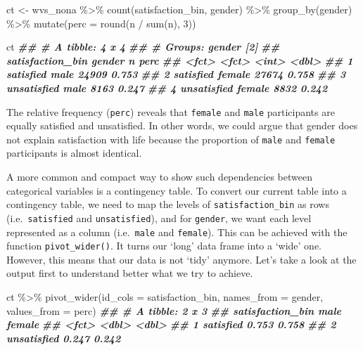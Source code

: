 \documentclass[
]{book}
\newenvironment{Shaded}{\begin{snugshade}}{\end{snugshade}}
\newcommand{\AttributeTok}[1]{\textcolor[rgb]{0.77,0.63,0.00}{#1}}
\newcommand{\DecValTok}[1]{\textcolor[rgb]{0.00,0.00,0.81}{#1}}
\newcommand{\DocumentationTok}[1]{\textcolor[rgb]{0.56,0.35,0.01}{\textbf{\textit{#1}}}}
\newcommand{\FunctionTok}[1]{\textcolor[rgb]{0.00,0.00,0.00}{#1}}
\newcommand{\NormalTok}[1]{#1}
\newcommand{\OtherTok}[1]{\textcolor[rgb]{0.56,0.35,0.01}{#1}}
\newcommand{\SpecialCharTok}[1]{\textcolor[rgb]{0.00,0.00,0.00}{#1}}
\begin{document}
\begin{Shaded}
\begin{Highlighting}[]
\NormalTok{ct }\OtherTok{\textless{}{-}}\NormalTok{ wvs\_nona }\SpecialCharTok{\%\textgreater{}\%}
  \FunctionTok{count}\NormalTok{(satisfaction\_bin, gender) }\SpecialCharTok{\%\textgreater{}\%}
  \FunctionTok{group\_by}\NormalTok{(gender) }\SpecialCharTok{\%\textgreater{}\%}
  \FunctionTok{mutate}\NormalTok{(}\AttributeTok{perc =} \FunctionTok{round}\NormalTok{(n }\SpecialCharTok{/} \FunctionTok{sum}\NormalTok{(n), }\DecValTok{3}\NormalTok{))}

\NormalTok{ct}
\DocumentationTok{\#\# \# A tibble: 4 x 4}
\DocumentationTok{\#\# \# Groups:   gender [2]}
\DocumentationTok{\#\#   satisfaction\_bin gender     n  perc}
\DocumentationTok{\#\#   \textless{}fct\textgreater{}            \textless{}fct\textgreater{}  \textless{}int\textgreater{} \textless{}dbl\textgreater{}}
\DocumentationTok{\#\# 1 satisfied        male   24909 0.753}
\DocumentationTok{\#\# 2 satisfied        female 27674 0.758}
\DocumentationTok{\#\# 3 unsatisfied      male    8163 0.247}
\DocumentationTok{\#\# 4 unsatisfied      female  8832 0.242}
\end{Highlighting}
\end{Shaded}

The relative frequency (\texttt{perc}) reveals that \texttt{female} and \texttt{male} participants are equally satisfied and unsatisfied. In other words, we could argue that gender does not explain satisfaction with life because the proportion of \texttt{male} and \texttt{female} participants is almost identical.

A more common and compact way to show such dependencies between categorical variables is a contingency table. To convert our current table into a contingency table, we need to map the levels of \texttt{satisfaction\_bin} as rows (i.e.~\texttt{satisfied} and \texttt{unsatisfied}), and for \texttt{gender}, we want each level represented as a column (i.e.~\texttt{male} and \texttt{female}). This can be achieved with the function \texttt{pivot\_wider()}. It turns our `long' data frame into a `wide' one. However, this means that our data is not `tidy' anymore. Let's take a look at the output first to understand better what we try to achieve.

\begin{Shaded}
\begin{Highlighting}[]
\NormalTok{ct }\SpecialCharTok{\%\textgreater{}\%} \FunctionTok{pivot\_wider}\NormalTok{(}\AttributeTok{id\_cols =}\NormalTok{ satisfaction\_bin,}
                   \AttributeTok{names\_from =}\NormalTok{ gender,}
                   \AttributeTok{values\_from =}\NormalTok{ perc)}
\DocumentationTok{\#\# \# A tibble: 2 x 3}
\DocumentationTok{\#\#   satisfaction\_bin  male female}
\DocumentationTok{\#\#   \textless{}fct\textgreater{}            \textless{}dbl\textgreater{}  \textless{}dbl\textgreater{}}
\DocumentationTok{\#\# 1 satisfied        0.753  0.758}
\DocumentationTok{\#\# 2 unsatisfied      0.247  0.242}
\end{Highlighting}
\end{Shaded}
\end{document}
